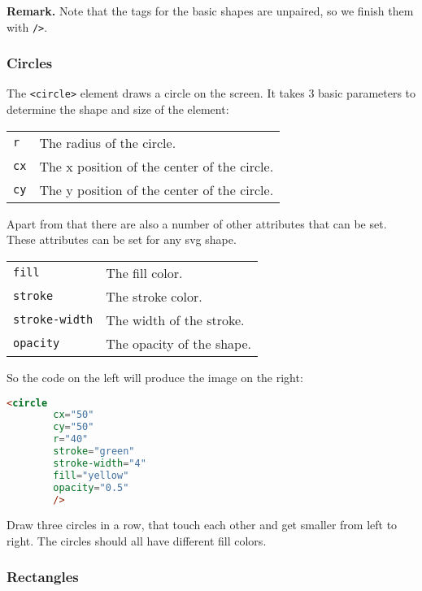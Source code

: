 \documentclass[11pt,a4paper]{report}
\begin{document}
{\bf Remark.} Note that the tags for the basic shapes are unpaired, so we finish them with \verb|/>|.


\newpage

\subsubsection{Circles}
The \verb|<circle>| element draws a circle on the screen. It takes 3 basic parameters to determine the shape and size of the element:
\begin{center}
\begin{tabular}{l|p{15cm}}
\verb|r| & The radius of the circle. \\
\verb|cx| & The x position of the center of the circle. \\
\verb|cy| & The y position of the center of the circle. 
\end{tabular}
\end{center}
Apart from that there are also a number of other attributes that can be set. These attributes can be set for any svg shape.
\begin{center}
\begin{tabular}{l|p{15cm}}
\verb|fill| & The fill color. \\
\verb|stroke| & The stroke color. \\
\verb|stroke-width| & The width of the stroke. \\
\verb|opacity| & The opacity of the shape. 
\end{tabular}
\end{center}

So the code on the left will produce the image on the right:
\begin{multicols}{2}
\begin{lstlisting}[language=html]
<circle
        cx="50"
        cy="50"
        r="40"
        stroke="green"
        stroke-width="4"
        fill="yellow"
        opacity="0.5"
        />
\end{lstlisting}
\columnbreak

\end{multicols}

\begin{ex}
Draw three circles in a row, that touch each other and get smaller from left to right. The circles should all have different fill colors.
\end{ex}

\subsubsection{Rectangles} 
 
\end{document}
